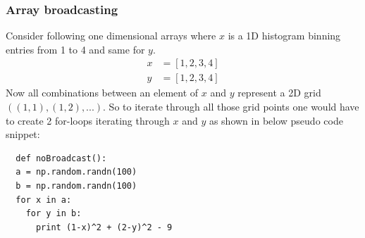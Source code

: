 \documentclass[11pt]{scrreprt}
\begin{document}
\newpage
\subsubsection{Array broadcasting}
Consider following one dimensional arrays where $x$ is a 1D histogram binning entries from 1 to 4 and same for $y$. 
\begin{align*}
  x &= [1, 2, 3, 4]\\
  y &= [1, 2, 3, 4]  
\end{align*}
Now all combinations between an element of $x$ and $y$ represent a 2D grid $\left((1,1), (1,2), ...\right)$. So to iterate through all those grid points one would have to create 2 for-loops iterating through $x$ and $y$ as shown in below pseudo code snippet: %
    \begin{lstlisting}
  def noBroadcast():
  a = np.random.randn(100)
  b = np.random.randn(100) 
  for x in a:
    for y in b:
      print (1-x)^2 + (2-y)^2 - 9
\end{lstlisting} 
\end{document}
